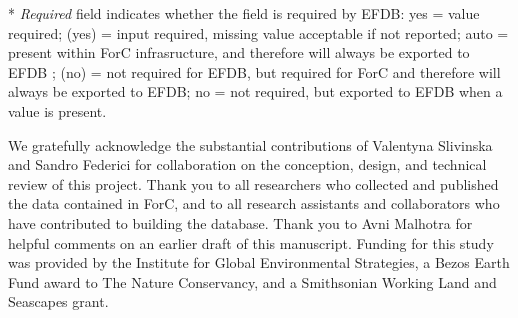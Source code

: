 \documentclass[, manuscript]{copernicus}
\begin{document}
* \emph{Required} field indicates whether the field is required by EFDB:
yes = value required; (yes) = input required, missing value acceptable
if not reported; auto = present within ForC infrasructure, and therefore
will always be exported to EFDB ; (no) = not required for EFDB, but
required for ForC and therefore will always be exported to EFDB; no =
not required, but exported to EFDB when a value is present.











\begin{acknowledgements}
We gratefully acknowledge the substantial contributions of Valentyna
Slivinska and Sandro Federici for collaboration on the conception,
design, and technical review of this project. Thank you to all
researchers who collected and published the data contained in ForC, and
to all research assistants and collaborators who have contributed to
building the database. Thank you to Avni Malhotra for helpful comments
on an earlier draft of this manuscript. Funding for this study was
provided by the Institute for Global Environmental Strategies, a Bezos
Earth Fund award to The Nature Conservancy, and a Smithsonian Working
Land and Seascapes grant.
\end{acknowledgements}
\end{document}
